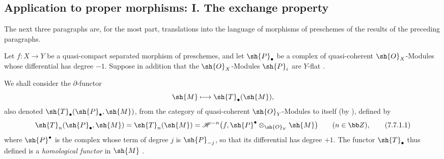 \subsection{Application to proper morphisms: I. The exchange property}
\label{subsection:III.7.7}
\label{III.7.7}

The next three paragraphs are, for the most part,
translations into the language of morphisms of preschemes
of the results of the preceding paragraphs.

\begin{env}[7.7.1]
\label{III.7.7.1}
Let $f:X\to Y$ be a quasi-compact separated morphism of
preschemes, and let $\sh{P}_\bullet$ be a complex of
quasi-coherent $\sh{O}_X$-Modules whose differential has
degree $-1$.  Suppose in addition that the $\sh{O}_X$-Modules
$\sh{P}_i$ are $Y$-flat .

We shall consider the $\partial$-functor
\[
  \sh{M}\longmapsto\sh{T}_\bullet(\sh{M}),
\]
also denoted
$\sh{T}_\bullet(\sh{P}_\bullet,\sh{M})$, from the category of
quasi-coherent $\sh{O}_Y$-Modules to itself (by
), defined by
\[
  \sh{T}_n(\sh{P}_\bullet,\sh{M})
  =\sh{T}_n(\sh{M})
  =\mathscr{H}^{-n}
    \bigl(f,\sh{P}^\bullet\otimes_{\sh{O}_Y}\sh{M}\bigr)
  \qquad(n\in\bb Z),
  \tag{7.7.1.1}\label{III.7.7.1.1}
\]
where $\sh{P}^\bullet$ is the complex whose term of degree
$j$ is $\sh{P}_{-j}$, so that its differential has degree
$+1$.  The functor $\sh{T}_\bullet$ thus defined is a
\emph{homological functor} in $\sh{M}$ .
\end{env}


